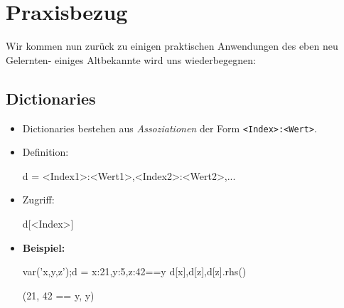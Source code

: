\documentclass[fontsize=12pt,paper=a4,twoside,bibtotoc,idxtotoc,
liststotoc,pagesize,BCOR1.2cm,DIV15,chapterprefix,pagesize=pdftex]{scrbook}
\begin{document}
\section{Praxisbezug}
Wir kommen nun zurück zu einigen praktischen Anwendungen des eben neu Gelernten- einiges Altbekannte wird uns wiederbegegnen:
\subsection{Dictionaries}
\begin{itemize}
\item Dictionaries bestehen aus \emph{Assoziationen} der Form \verb+<Index>:<Wert>+. 
\item Definition:
\begin{sagein}
d = {<Index1>:<Wert1>,<Index2>:<Wert2>,...}
\end{sagein}
\item Zugriff:
\begin{sagein}
d[<Index>]
\end{sagein}
\item \textbf{Beispiel:}
\begin{sagein}
var('x,y,z');d = {x:21,y:5,z:42==y}
d[x],d[z],d[z].rhs()
\end{sagein}
\begin{sage}
(21, 42 == y, y)
\end{sage}
\end{itemize}
\end{document}
